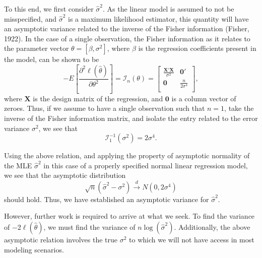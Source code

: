 		To this end, we first consider $\hat{\sigma}^2$. As the linear model is assumed to not be misspecified, and $\hat{\sigma}^2$ is a maximum likelihood
		estimator, this quantity will have an asymptotic variance related to the inverse of the Fisher information (Fisher, 1922). In the case of a single
		observation, the Fisher information as it relates to the parameter vector $\theta = [\beta, \sigma^2]$, where $\beta$ is the regression coefficients
		present in the model, can be shown to be
		\begin{equation}
			- E \left[ \frac{\partial^2 \ell (\hat{\theta}  )}{\partial \theta^2} \right] = \mathcal{I}_{n}(\theta) =
			\begin{bmatrix}
				\frac{\mathbf{X}' \mathbf{X}}{\sigma^2} & \mathbf{0}' \\
				\mathbf{0} & \frac{n}{2 \sigma^4} \\
			\end{bmatrix}
			,
		\end{equation}
		where $\mathbf{X}$ is the design matrix of the regression, and $\mathbf{0}$ is a column vector of zeroes. Thus, if we assume to have a single observation
		such that $n=1$, take the inverse of the Fisher information matrix, and isolate the entry related to the error variance $\sigma^2$, we see that
		\begin{equation}
			\mathcal{I}_{1}^{-1}(\sigma ^2) = 2 \sigma ^4 .
		\end{equation}
		
		Using the above relation, and applying the property of asymptotic normality of the MLE $\hat{\sigma}^2$ in this case of a properly specified normal linear
		regression model, we see that the asymptotic distribution
		\begin{equation}
			\sqrt{n} (\hat{\sigma}^2 - \sigma^2) \xrightarrow[]{d} N(0, 2 \sigma ^4 )
		\end{equation}
		should hold. Thus, we have established an asymptotic variance for $\hat{\sigma}^2$.

		However, further work is required to arrive at what we seek. To find the variance of $-2 \ell (\hat{\theta}  )$, we must find the variance of $n \log(\hat{\sigma}^2)$.
		Additionally, the above asymptotic relation involves the true $\sigma^2$ to which we will not have access in most modeling scenarios.

